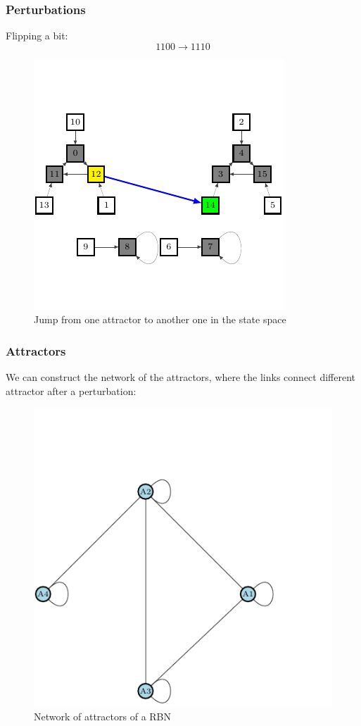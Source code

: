 \documentclass{beamer}
\begin{document}
\begin{frame}
\frametitle{Perturbations}


Flipping a bit:
$$
1100 \to 1110
$$




\begin{figure}[h]
\centering
\includegraphics[scale=0.8]{fg4.pdf}
\caption{Jump from one attractor to another one in the state space}
\label{fig:rb4}
\end{figure}

\end{frame}



\begin{frame}
\frametitle{Attractors}
We can construct the network of the attractors, where the links connect different attractor after a perturbation:
\begin{figure}
\centering
\includegraphics[scale=0.6]{fg5.pdf}
\caption{Network of attractors of a RBN}
\end{figure}
\end{frame}
\end{document}
